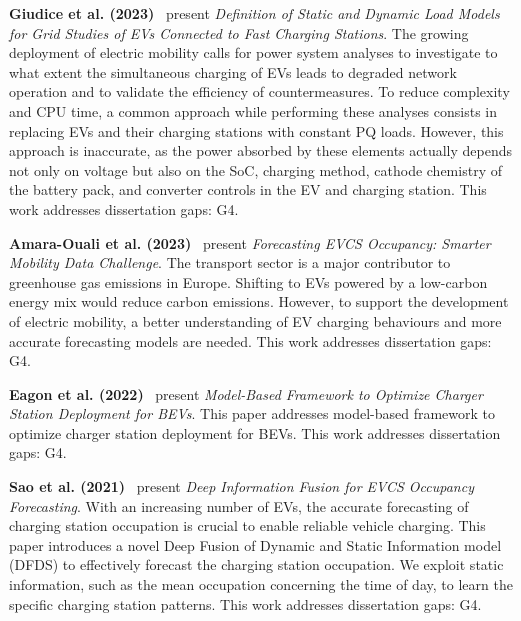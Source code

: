 \documentclass[letterpaper, 12pt, oneside, doublespacing]{Thesis}
\begin{document}
\noindent \textbf{Giudice et al. (2023)}~\cite{definition_of_2023} present \textit{Definition of Static and Dynamic Load Models for Grid Studies of EVs Connected to Fast Charging Stations}. The growing deployment of electric mobility calls for power system analyses to investigate to what extent the simultaneous charging of EVs leads to degraded network operation and to validate the efficiency of countermeasures. To reduce complexity and CPU time, a common approach while performing these analyses consists in replacing EVs and their charging stations with constant PQ loads. However, this approach is inaccurate, as the power absorbed by these elements actually depends not only on voltage but also on the SoC, charging method, cathode chemistry of the battery pack, and converter controls in the EV and charging station. This work addresses dissertation gaps: G4.



\noindent \textbf{Amara-Ouali et al. (2023)}~\cite{forecasting_electric_2023} present \textit{Forecasting EVCS Occupancy: Smarter Mobility Data Challenge}. The transport sector is a major contributor to greenhouse gas emissions in Europe. Shifting to EVs powered by a low-carbon energy mix would reduce carbon emissions. However, to support the development of electric mobility, a better understanding of EV charging behaviours and more accurate forecasting models are needed. This work addresses dissertation gaps: G4.



\noindent \textbf{Eagon et al. (2022)}~\cite{model-based_framework_2022} present \textit{Model-Based Framework to Optimize Charger Station Deployment for BEVs}. This paper addresses model-based framework to optimize charger station deployment for BEVs. This work addresses dissertation gaps: G4.



\noindent \textbf{Sao et al. (2021)}~\cite{deep_information_2021} present \textit{Deep Information Fusion for EVCS Occupancy Forecasting}. With an increasing number of EVs, the accurate forecasting of charging station occupation is crucial to enable reliable vehicle charging. This paper introduces a novel Deep Fusion of Dynamic and Static Information model (DFDS) to effectively forecast the charging station occupation. We exploit static information, such as the mean occupation concerning the time of day, to learn the specific charging station patterns. This work addresses dissertation gaps: G4.
\end{document}
